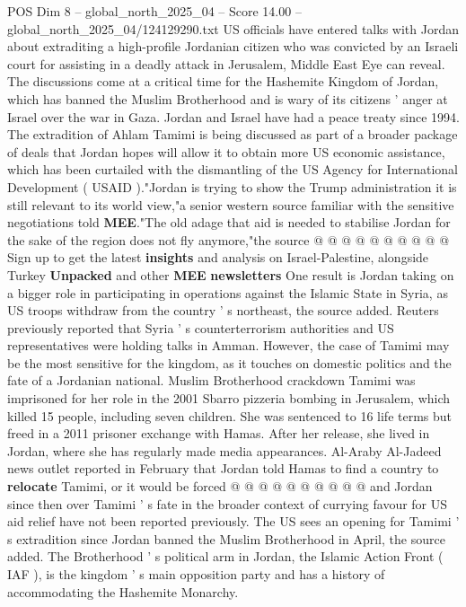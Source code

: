 \begin{textsample}{POS Dim 8 – global\_north\_2025\_04 – Score 14.00 – global\_north\_2025\_04/124129290.txt}  \label{ex:f8_pos_025}
US officials have entered talks with Jordan about extraditing a high-profile Jordanian citizen who was convicted by an Israeli court for assisting in a deadly attack in Jerusalem, Middle East Eye can reveal.
The discussions come at a critical time for the Hashemite Kingdom of Jordan, which has banned the Muslim Brotherhood and is wary of its citizens ' anger at Israel over the war in Gaza.
Jordan and Israel have had a peace treaty since 1994.
The extradition of Ahlam Tamimi is being discussed as part of a broader package of deals that Jordan hopes will allow it to obtain more US economic assistance, which has been curtailed with the dismantling of the US Agency for International Development ( USAID )."Jordan is trying to show the Trump administration it is still relevant to its world view,"a senior western source familiar with the sensitive negotiations told \textbf{MEE}."The old adage that aid is needed to stabilise Jordan for the sake of the region does not fly anymore,"the source @ @ @ @ @ @ @ @ @ @ Sign up to get the latest \textbf{insights} and analysis on Israel-Palestine, alongside Turkey \textbf{Unpacked} and other \textbf{MEE} \textbf{newsletters} One result is Jordan taking on a bigger role in participating in operations against the Islamic State in Syria, as US troops withdraw from the country ' s northeast, the source added.
Reuters previously reported that Syria ' s counterterrorism authorities and US representatives were holding talks in Amman.
However, the case of Tamimi may be the most sensitive for the kingdom, as it touches on domestic politics and the fate of a Jordanian national.
Muslim Brotherhood crackdown Tamimi was imprisoned for her role in the 2001 Sbarro pizzeria bombing in Jerusalem, which killed 15 people, including seven children.
She was sentenced to 16 life terms but freed in a 2011 prisoner exchange with Hamas.
After her release, she lived in Jordan, where she has regularly made media appearances.
Al-Araby Al-Jadeed news outlet reported in February that Jordan told Hamas to find a country to \textbf{relocate} Tamimi, or it would be forced @ @ @ @ @ @ @ @ @ @ and Jordan since then over Tamimi ' s fate in the broader context of currying favour for US aid relief have not been reported previously.
The US sees an opening for Tamimi ' s extradition since Jordan banned the Muslim Brotherhood in April, the source added.
The Brotherhood ' s political arm in Jordan, the Islamic Action Front ( IAF ), is the kingdom ' s main opposition party and has a history of accommodating the Hashemite Monarchy.

\end{textsample}
